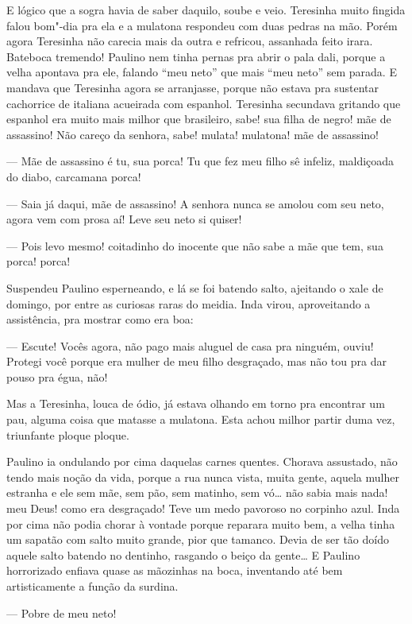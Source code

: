 \begin{linenumbers}
E lógico que a sogra havia de saber daquilo, soube e veio. Teresinha
muito fingida falou bom"-dia pra ela e a mulatona respondeu com duas
pedras na mão. Porém agora Teresinha não carecia mais da outra e
refricou, assanhada feito irara. Bateboca tremendo! Paulino nem tinha
pernas pra abrir o pala dali, porque a velha apontava pra ele, falando
``meu neto'' que mais ``meu neto'' sem parada. E mandava que Teresinha
agora se arranjasse, porque não estava pra sustentar cachorrice de
italiana acueirada com espanhol. Teresinha secundava gritando que
espanhol era muito mais milhor que brasileiro, sabe! sua filha de negro!
mãe de assassino! Não careço da senhora, sabe! mulata! mulatona! mãe de
assassino!

--- Mãe de assassino é tu, sua porca! Tu que fez meu filho sê infeliz,
maldiçoada do diabo, carcamana porca!

--- Saia já daqui, mãe de assassino! A senhora nunca se amolou com seu
neto, agora vem com prosa aí! Leve seu neto si quiser!

--- Pois levo mesmo! coitadinho do inocente que não sabe a mãe que tem,
sua porca! porca!

Suspendeu Paulino esperneando, e lá se foi batendo salto, ajeitando o
xale de domingo, por entre as curiosas raras do meidia. Inda virou,
aproveitando a assistência, pra mostrar como era boa:

--- Escute! Vocês agora, não pago mais aluguel de casa pra ninguém,
ouviu! Protegi você porque era mulher de meu filho desgraçado, mas não
tou pra dar pouso pra égua, não!

Mas a Teresinha, louca de ódio, já estava olhando em torno pra encontrar
um pau, alguma coisa que matasse a mulatona. Esta achou milhor partir
duma vez, triunfante ploque ploque.

Paulino ia ondulando por cima daquelas carnes quentes. Chorava
assustado, não tendo mais noção da vida, porque a rua nunca vista, muita
gente, aquela mulher estranha e ele sem mãe, sem pão, sem matinho, sem
vó\ldots{} não sabia mais nada! meu Deus! como era desgraçado! Teve um medo
pavoroso no corpinho azul. Inda por cima não podia chorar à vontade
porque reparara muito bem, a velha tinha um sapatão com salto muito
grande, pior que tamanco. Devia de ser tão doído aquele salto batendo no
dentinho, rasgando o beiço da gente\ldots{} E Paulino horrorizado enfiava
quase as mãozinhas na boca, inventando até bem artisticamente a função
da surdina.

--- Pobre de meu neto!


\end{linenumbers}
